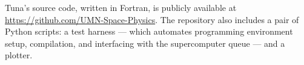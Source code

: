 Tuna's source code, written in Fortran, is publicly available at
{\url{https://github.com/UMN-Space-Physics}}. The repository also includes a pair
of Python scripts: a test harness --- which automates programming environment
setup, compilation, and interfacing with the supercomputer queue --- and a
plotter. 







